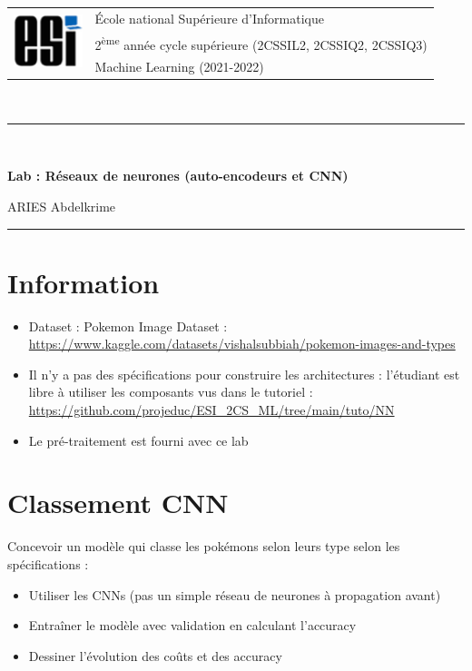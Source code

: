 \documentclass[11pt, a4paper]{article}
\begin{document}

\noindent
\begin{tabular}{ll}
\multirow{3}{*}{\includegraphics[width=2cm]{../img/esi-logo.png}} & \'Ecole national Supérieure d'Informatique\\
& 2\textsuperscript{ème} année cycle supérieure (2CSSIL2, 2CSSIQ2, 2CSSIQ3)\\
& Machine Learning (2021-2022)
\end{tabular}\\[.25cm]
\noindent\rule{\textwidth}{1pt}\\%
\begin{center}
{\LARGE \textbf{Lab : Réseaux de neurones (auto-encodeurs et CNN)}}
\begin{flushright}
	ARIES Abdelkrime
\end{flushright}
\end{center}
\noindent\rule{\textwidth}{1pt}

\section*{Information}

\begin{itemize}
	\item Dataset : Pokemon Image Dataset : {\scriptsize\url{https://www.kaggle.com/datasets/vishalsubbiah/pokemon-images-and-types}}
	\item Il n'y a pas des spécifications pour construire les architectures : l'étudiant est libre à utiliser les composants vus dans le tutoriel : {\scriptsize \url{https://github.com/projeduc/ESI_2CS_ML/tree/main/tuto/NN}}
	\item Le pré-traitement est fourni avec ce lab 
\end{itemize}

\section*{Classement CNN}

Concevoir un modèle qui classe les pokémons selon leurs type selon les spécifications : 
\begin{itemize}
	\item Utiliser les CNNs (pas un simple réseau de neurones à propagation avant)
	\item Entraîner le modèle avec validation en calculant l'accuracy
	\item Dessiner l'évolution des coûts et des accuracy
\end{itemize}
\end{document}
